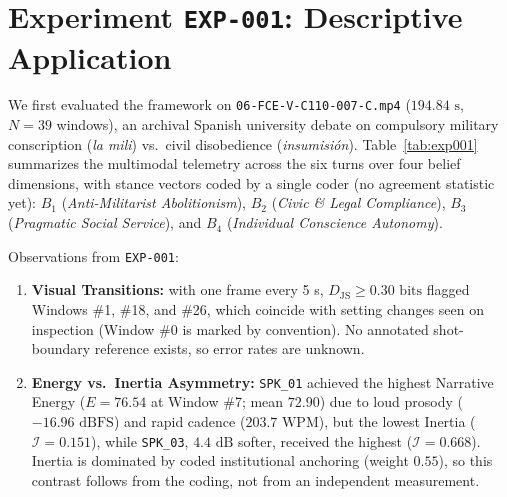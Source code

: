 \documentclass[10pt,letterpaper]{article}
\begin{document}
\section{Experiment \texttt{EXP-001}: Descriptive Application}

We first evaluated the framework on \texttt{06-FCE-V-C110-007-C.mp4} ($194.84\text{ s}$, $N=39$ windows), an archival Spanish university debate on compulsory military conscription (\emph{la mili}) vs.\ civil disobedience (\emph{insumisi\'on}). Table~\ref{tab:exp001} summarizes the multimodal telemetry across the six turns over four belief dimensions, with stance vectors coded by a single coder (no agreement statistic yet): $B_1$ (\emph{Anti-Militarist Abolitionism}), $B_2$ (\emph{Civic \& Legal Compliance}), $B_3$ (\emph{Pragmatic Social Service}), and $B_4$ (\emph{Individual Conscience Autonomy}).

Observations from \texttt{EXP-001}:
\begin{enumerate}
  \item \textbf{Visual Transitions:} with one frame every 5 s, $D_{\mathrm{JS}} \ge 0.30\text{ bits}$ flagged Windows \#1, \#18, and \#26, which coincide with setting changes seen on inspection (Window \#0 is marked by convention). No annotated shot-boundary reference exists, so error rates are unknown.
  \item \textbf{Energy vs.\ Inertia Asymmetry:} \texttt{SPK\_01} achieved the highest Narrative Energy ($E = 76.54$ at Window \#7; mean $72.90$) due to loud prosody ($-16.96\text{ dBFS}$) and rapid cadence ($203.7\text{ WPM}$), but the lowest Inertia ($\mathcal{I} = 0.151$), while \texttt{SPK\_03}, $4.4\text{ dB}$ softer, received the highest ($\mathcal{I} = 0.668$). Inertia is dominated by coded institutional anchoring (weight $0.55$), so this contrast follows from the coding, not from an independent measurement.
\end{enumerate}
\end{document}
